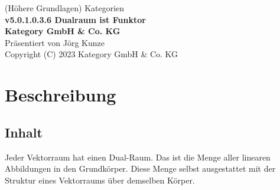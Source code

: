 \documentclass[a4paper]{amsart}
\theoremstyle{definition}
\begin{document}
\begin{titlepage}
\centering
{\huge
(Höhere Grundlagen) Kategorien\\[1cm]
\textbf{v5.0.1.0.3.6 Dualraum ist Funktor}
}\\[1cm]

\textbf{Kategory GmbH \& Co. KG}\\
Präsentiert von Jörg Kunze\\
Copyright (C) 2023 Kategory GmbH \& Co. KG

\end{titlepage}

%

\newpage

\section*{Beschreibung}

\subsection*{Inhalt}
Jeder Vektorraum hat einen Dual-Raum. Das ist die Menge aller linearen Abbildungen in den Grundkörper.
Diese Menge selbst ausgestattet mit der Struktur eines Vektorraums über demselben Körper.
\end{document}
